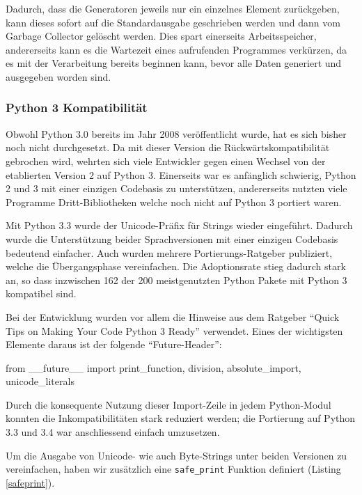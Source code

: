 
Dadurch, dass die Generatoren jeweils nur ein einzelnes Element zurückgeben,
kann dieses sofort auf die Standardausgabe geschrieben werden und dann vom
Garbage Collector gelöscht werden. Dies spart einerseits Arbeitsspeicher,
andererseits kann es die Wartezeit eines aufrufenden Programmes verkürzen, da es
mit der Verarbeitung bereits beginnen kann, bevor alle Daten generiert und
ausgegeben worden sind.

\subsubsection{Python 3 Kompatibilität}

Obwohl Python 3.0 bereits im Jahr 2008 veröffentlicht wurde, hat es sich bisher
noch nicht durchgesetzt. Da mit dieser Version
die Rückwärtskompatibilität gebrochen wird, wehrten sich viele Entwickler
gegen einen Wechsel von der etablierten Version 2 auf Python 3. Einerseits
war es anfänglich schwierig, Python 2 und 3 mit einer einzigen Codebasis zu
unterstützen, andererseits nutzten viele Programme Dritt-Bibliotheken welche
noch nicht auf Python 3 portiert waren.

Mit Python 3.3 wurde der Unicode-Präfix für Strings wieder eingeführt\cite{PEP414:2012}.
Dadurch wurde die Unterstützung beider Sprachversionen mit einer
einzigen Codebasis bedeutend einfacher. Auch wurden mehrere
Portierungs-Ratgeber publiziert, welche die Übergangsphase
vereinfachen\cite{regebro2013porting, ronacher2013porting}. Die Adoptionsrate
stieg dadurch stark an, so dass inzwischen 162 der 200 meistgenutzten Python
Pakete mit Python 3 kompatibel sind\cite{py3adoption}.

Bei der Entwicklung wurden vor allem die Hinweise aus dem Ratgeber
\enquote{Quick Tips on Making Your Code Python 3 Ready}\cite{deshev2012porting}
verwendet. Eines der wichtigsten Elemente daraus ist der folgende
\enquote{Future-Header}:

\begin{pythoncode}
from __future__ import print_function, division, absolute_import, unicode_literals
\end{pythoncode}

Durch die konsequente Nutzung dieser Import-Zeile in jedem Python-Modul konnten
die Inkompatibilitäten stark reduziert werden; die Portierung auf Python 3.3 und
3.4 war anschliessend einfach umzusetzen.

Um die Ausgabe von Unicode- wie auch Byte-Strings unter beiden Versionen zu
vereinfachen, haben wir zusätzlich eine \texttt{safe\_print} Funktion definiert
(Listing \ref{safeprint}).

